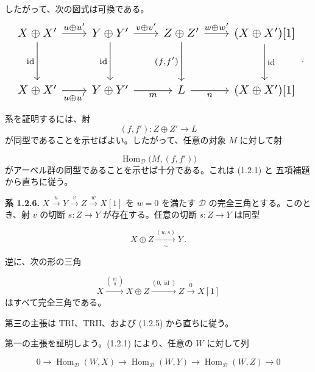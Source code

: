 \clearpage
{}%
\begingroup
\small
\setlength{\abovedisplayskip}{4pt plus 2pt minus 2pt}%
\setlength{\belowdisplayskip}{4pt plus 2pt minus 2pt}%

したがって、次の図式は可換である。
\begin{equation*}
  \resizebox{0.98\linewidth}{!}{%
    $\begin{tikzcd}[ampersand replacement=\&,column sep=2.1em,row sep=3.1em]
      X\oplus X' \arrow[r,"{u\oplus u'}"] \arrow[d,"{\operatorname{id}}"']
        \& Y\oplus Y' \arrow[r,"{v\oplus v'}"] \arrow[d,"{\operatorname{id}}"']
        \& Z\oplus Z' \arrow[r,"{w\oplus w'}"] \arrow[d,"{(f,f')}"']
        \& (X\oplus X')[1] \arrow[d,"{\operatorname{id}}"] \\
      X\oplus X' \arrow[r,"{u\oplus u'}"']
        \& Y\oplus Y' \arrow[r,"m"']
        \& L \arrow[r,"n"']
        \& (X\oplus X')[1]
    \end{tikzcd}$%
  }\,.
\end{equation*}

系を証明するには、射
\[
  (f,f')\colon Z\oplus Z'\longrightarrow L
\]
が同型であることを示せばよい。したがって、任意の対象 $M$ に対して射

\[
  \operatorname{Hom}_{\mathcal D}\bigl(M,(f,f')\bigr)
\]
がアーベル群の同型であることを示せば十分である。これは (1.2.1) と
五項補題から直ちに従う。


\medskip
\noindent\textbf{系 1.2.6.}\quad
$X\xrightarrow{u}Y\xrightarrow{v}Z\xrightarrow{w}X[1]$ を
$w=0$ を満たす $\mathcal D$ の完全三角とする。このとき、射 $v$ の切断
$s\colon Z\longrightarrow Y$ が存在する。任意の切断
$s\colon Z\longrightarrow Y$ は同型

\[
  X\oplus Z\xrightarrow[\sim]{(u,s)}Y\,.
\]

逆に、次の形の三角

\begin{equation}
  X\xrightarrow{\binom{\operatorname{id}}{0}}X\oplus Z
  \xrightarrow{(0,\operatorname{id})}Z\xrightarrow{0}X[1]
  \tag{1.2.6.1}
\end{equation}
はすべて完全三角である。

第三の主張は TRI、TRII、および (1.2.5) から直ちに従う。

第一の主張を証明しよう。(1.2.1) により、任意の $W$ に対して列

\begin{equation}
  0\longrightarrow\operatorname{Hom}_{\mathcal D}(W,X)
  \longrightarrow\operatorname{Hom}_{\mathcal D}(W,Y)
  \longrightarrow\operatorname{Hom}_{\mathcal D}(W,Z)
  \longrightarrow0
  \tag{1.2.6.2}
\end{equation}
\endgroup
